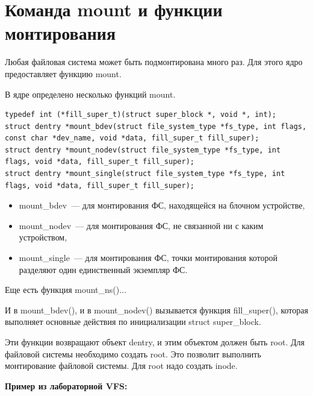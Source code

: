 \section{Команда mount и функции монтирования}

Любая файловая система может быть подмонтирована много раз. Для этого ядро предоставляет функцию mount.

В ядре определено несколько функций mount.
\begin{lstlisting}
typedef int (*fill_super_t)(struct super_block *, void *, int);
struct dentry *mount_bdev(struct file_system_type *fs_type, int flags, const char *dev_name, void *data, fill_super_t fill_super);
struct dentry *mount_nodev(struct file_system_type *fs_type, int flags, void *data, fill_super_t fill_super);
struct dentry *mount_single(struct file_system_type *fs_type, int flags, void *data, fill_super_t fill_super);
\end{lstlisting}

\begin{itemize}
    \item mount\_bdev — для монтирования ФС, находящейся на блочном устройстве,
    \item mount\_nodev — для монтирования ФС, не связанной ни с каким устройством,
    \item mount\_single — для монтирования ФС, точки монтирования которой разделяют один единственный экземпляр ФС.
\end{itemize}

Еще есть функция mount\_ns()...

И в mount\_bdev(), и в mount\_nodev() вызывается функция fill\_super(), которая выполняет основные действия по инициализации struct super\_block.

Эти функции возвращают объект dentry, и этим объектом должен быть root. Для файловой системы необходимо создать root. Это позволит выполнить монтирование файловой системы. Для root надо создать inode.


\textbf{Пример из лабораторной VFS:}

